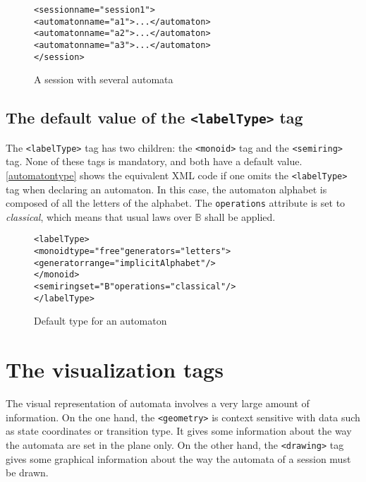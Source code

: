 \documentclass[a4paper]{article}
\newcommand{\xtag}[1]{\texttt{<#1>}}
\newcommand{\xattr}[1]{\texttt{#1}}
\begin{document}
\begin{figure}[htp]
  \small
  \begin{center}
\begin{alltt}
<session name="session1">
  <automaton name="a1">...</automaton>
  <automaton name="a2">...</automaton>
  <automaton name="a3">...</automaton>
</session>
\end{alltt}

\caption{A session with several automata}
\label{session1}
  \end{center}
\end{figure}

\subsection{The default value of the \xtag{labelType} tag}

The \xtag{labelType} tag has two children: the \xtag{monoid} tag and the
\xtag{semiring} tag. None of these tags is mandatory, and both have
a default value. \autoref{automatontype} shows the equivalent XML code if one
omits the \xtag{labelType} tag when declaring an automaton. In this case, the
automaton alphabet is composed of all the letters of the alphabet.
The \xattr{operations} attribute is set to \textit{classical},
which means that usual laws over $\mathbb{B}$ shall be applied.


\begin{figure}[htp]
  \begin{center}
\begin{alltt}
<labelType>
  <monoid type="free" generators="letters">
     <generator range="implicitAlphabet"/>
  </monoid>
  <semiring set="B" operations="classical"/>
</labelType>
\end{alltt}

\caption{Default type for an automaton}
\label{automatontype}
  \end{center}
\end{figure}


\newpage
\section{The visualization tags}
\label{title_visualization}
The visual representation of automata involves a very large amount of
information. On the one hand, the \xtag{geometry} is context sensitive
with data such as state coordinates or transition type. It gives some
information about the way the automata are set in the plane only.  On
the other hand, the \xtag{drawing} tag gives some graphical information
about the way the automata of a session must be drawn.
\end{document}
